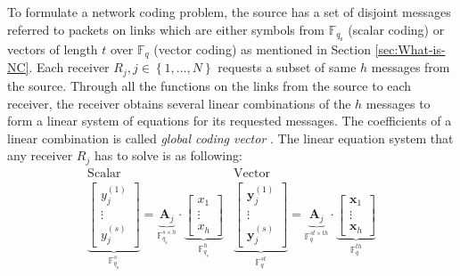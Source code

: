 To formulate a network coding problem, the source has a set of disjoint
messages referred to packets on links which are either symbols from
$\ensuremath{\mathbb{F}}_{q_{\mathrm{s}}}$ (scalar coding) or vectors
of length $t$ over $\ensuremath{\mathbb{F}}_{q}$ (vector coding)
as mentioned in Section \ref{sec:What-is-NC}. Each receiver $R_{j},j\in\left\{ 1,\ldots,N\right\} $
requests a subset of same $h$ messages from the source. Through all
the functions on the links from the source to each receiver, the receiver
obtains several linear combinations of the $h$ messages to form a
linear system of equations for its requested messages. The coefficients
of a linear combination is called \textit{global coding vector} \cite{Sanders:2003}.
The linear equation system that any receiver $R_{j}$ has to solve
is as following:
\begin{equation}
\begin{array}{c|c}
\mathrm{Scalar} & \mathrm{Vector}\\
\underset{\ensuremath{\mathbb{F}}_{q_{\mathrm{s}}}^{s}}{\underbrace{\left[\begin{array}{c}
y_{j}^{\left(1\right)}\\
\vdots\\
y_{j}^{\left(s\right)}
\end{array}\right]}}=\underset{\ensuremath{\mathbb{F}}_{q_{\mathrm{s}}}^{s\times h}}{\underbrace{\boldsymbol{A}_{j}}}\cdot\underset{\ensuremath{\mathbb{F}}_{q_{s}}^{h}}{\underbrace{\left[\begin{array}{c}
x_{1}\\
\vdots\\
x_{h}
\end{array}\right]}} & \underset{\ensuremath{\mathbb{F}}_{q}^{st}}{\underbrace{\left[\begin{array}{c}
\boldsymbol{y}_{j}^{\left(1\right)}\\
\vdots\\
\boldsymbol{y}_{j}^{\left(s\right)}
\end{array}\right]}}=\underset{\ensuremath{\mathbb{F}}_{q}^{st\times th}}{\underbrace{\boldsymbol{A}_{j}}}\cdot\underset{\ensuremath{\mathbb{F}}_{q}^{th}}{\underbrace{\left[\begin{array}{c}
\boldsymbol{x}_{1}\\
\vdots\\
\boldsymbol{x}_{h}
\end{array}\right]}}
\end{array}\label{eq:linear_system}
\end{equation}
